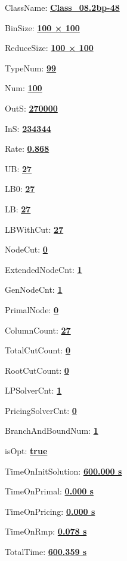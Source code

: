 \documentclass[11pt]{article}
\begin{document}
\pagestyle{empty}


ClassName: \underline{\textbf{Class_08.2bp-48}}
\par
BinSize: \underline{\textbf{100 × 100}}
\par
ReduceSize: \underline{\textbf{100 × 100}}
\par
TypeNum: \underline{\textbf{99}}
\par
Num: \underline{\textbf{100}}
\par
OutS: \underline{\textbf{270000}}
\par
InS: \underline{\textbf{234344}}
\par
Rate: \underline{\textbf{0.868}}
\par
UB: \underline{\textbf{27}}
\par
LB0: \underline{\textbf{27}}
\par
LB: \underline{\textbf{27}}
\par
LBWithCut: \underline{\textbf{27}}
\par
NodeCut: \underline{\textbf{0}}
\par
ExtendedNodeCnt: \underline{\textbf{1}}
\par
GenNodeCnt: \underline{\textbf{1}}
\par
PrimalNode: \underline{\textbf{0}}
\par
ColumnCount: \underline{\textbf{27}}
\par
TotalCutCount: \underline{\textbf{0}}
\par
RootCutCount: \underline{\textbf{0}}
\par
LPSolverCnt: \underline{\textbf{1}}
\par
PricingSolverCnt: \underline{\textbf{0}}
\par
BranchAndBoundNum: \underline{\textbf{1}}
\par
isOpt: \underline{\textbf{true}}
\par
TimeOnInitSolution: \underline{\textbf{600.000 s}}
\par
TimeOnPrimal: \underline{\textbf{0.000 s}}
\par
TimeOnPricing: \underline{\textbf{0.000 s}}
\par
TimeOnRmp: \underline{\textbf{0.078 s}}
\par
TotalTime: \underline{\textbf{600.359 s}}
\par
\newpage


\end{document}
